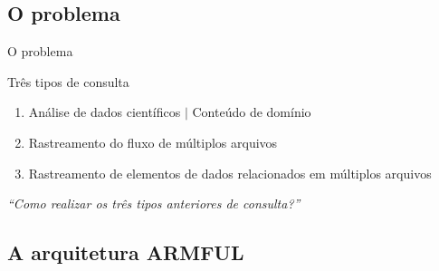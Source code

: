 \documentclass[12pt,compress]{beamer}
\begin{document}

\subsection*{O problema}

\begin{frame}[t]{O problema}
    \begin{exampleblock}{Três tipos de consulta}
    \begin{enumerate}
        \item Análise de \alert{dados científicos} $\mid$ Conteúdo de domínio
        \item Rastreamento do fluxo de \alert{múltiplos arquivos}
        \item Rastreamento de \alert{elementos de dados relacionados} em múltiplos arquivos
    \end{enumerate}
    \end{exampleblock}
    \vfill
    \pause
    \centerline{\textit{\large ``Como realizar os três tipos anteriores de consulta?''}}
    \vfill
\end{frame}


\subsection*{A arquitetura ARMFUL}
\end{document}
